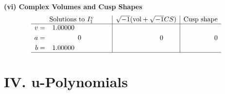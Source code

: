 \documentclass[1p]{elsarticle_modified}
\theoremstyle{definition}
\newcommand{\I}{\sqrt{-1}}
\begin{document}
\newpage\flushleft \textbf{(vi) Complex Volumes and Cusp Shapes}
$$\begin{array}{c|c|c}  
\text{Solutions to }I^v_{1}& \I (\text{vol} + \sqrt{-1}CS) & \text{Cusp shape}\\
 \hline 
\begin{aligned}
v &= \phantom{-}1.00000\phantom{ +0.000000I} \\
a &= \phantom{-0.000000 } 0 \\
b &= \phantom{-}1.00000\phantom{ +0.000000I}\end{aligned}
 & \phantom{-0.000000 } 0 & \phantom{-0.000000 } 0\\
 \hline 
 \end{array}$$\newpage
\newpage\renewcommand{\arraystretch}{1}
\centering \section*{ IV. u-Polynomials}
\end{document}
